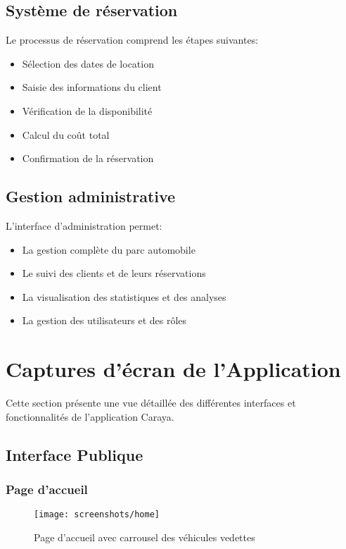\documentclass[12pt,a4paper]{report}
\begin{document}
\section{Système de réservation}
Le processus de réservation comprend les étapes suivantes:
\begin{itemize}
    \item Sélection des dates de location
    \item Saisie des informations du client
    \item Vérification de la disponibilité
    \item Calcul du coût total
    \item Confirmation de la réservation
\end{itemize}

\section{Gestion administrative}
L'interface d'administration permet:
\begin{itemize}
    \item La gestion complète du parc automobile
    \item Le suivi des clients et de leurs réservations
    \item La visualisation des statistiques et des analyses
    \item La gestion des utilisateurs et des rôles
\end{itemize}

\chapter{Captures d'écran de l'Application}
Cette section présente une vue détaillée des différentes interfaces et fonctionnalités de l'application Caraya.

\section{Interface Publique}

\subsection{Page d'accueil}
\begin{figure}[H]
    \centering
    \texttt{[image: screenshots/home]}
    \caption{Page d'accueil avec carrousel des véhicules vedettes}
\end{figure}
\end{document}
